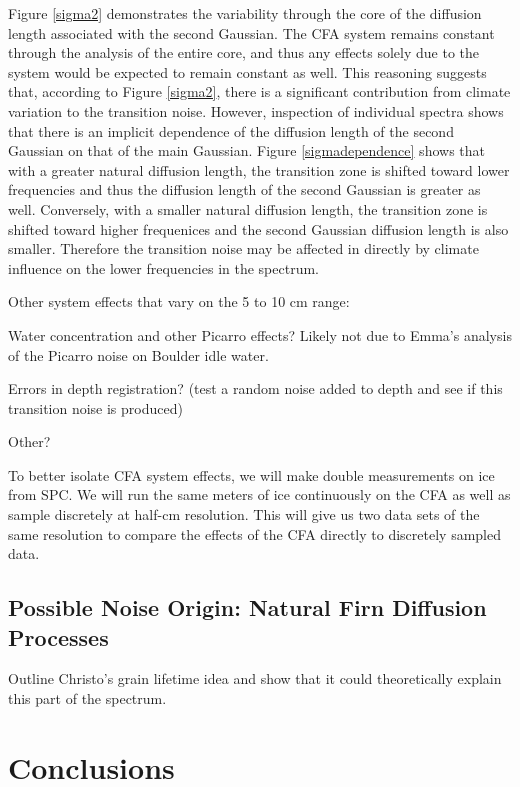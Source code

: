 \documentclass[draft, jgrga]{AGUTeX}
\begin{document}
\begin{article}
Figure \ref{sigma2} demonstrates the variability through the core of the diffusion length associated with the second Gaussian. The CFA system remains constant through the analysis of the entire core, and thus any effects solely due to the system would be expected to remain constant as well. This reasoning suggests that, according to Figure \ref{sigma2}, there is a significant contribution from climate variation to the transition noise. However, inspection of individual spectra shows that there is an implicit dependence of the diffusion length of the second Gaussian on that of the main Gaussian. Figure \ref{sigmadependence} shows that with a greater natural diffusion length, the transition zone is shifted toward lower frequencies and thus the diffusion length of the second Gaussian is greater as well. Conversely, with a smaller natural diffusion length, the transition zone is shifted toward higher frequenices and the second Gaussian diffusion length is also smaller. Therefore the transition noise may be affected in directly by climate influence on the lower frequencies in the spectrum.



Other system effects that vary on the 5 to 10 cm range:

Water concentration and other Picarro effects? Likely not due to Emma's analysis of the Picarro noise on Boulder idle water.

Errors in depth registration? (test a random noise added to depth and see if this transition noise is produced)

Other?

To better isolate CFA system effects, we will make double measurements on ice from SPC. We will run the same meters of ice continuously on the CFA as well as sample discretely at half-cm resolution. This will give us two data sets of the same resolution to compare the effects of the CFA directly to discretely sampled data.

\subsection{Possible Noise Origin: Natural Firn Diffusion Processes}

Outline Christo's grain lifetime idea and show that it could theoretically explain this part of the spectrum.



\section{Conclusions}


\end{article}
\end{document}
